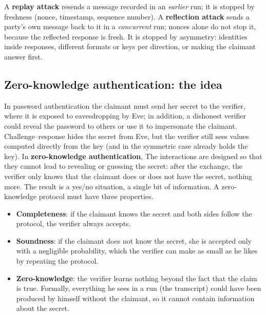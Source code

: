 \begin{trap}
A \textbf{replay attack} resends a message recorded in an \emph{earlier} run; it is stopped by freshness (nonce, timestamp, sequence number). A \textbf{reflection attack} sends a party's own message back to it in a \emph{concurrent} run; nonces alone do not stop it, because the reflected response is fresh. It is stopped by asymmetry: identities inside responses, different formats or keys per direction, or making the claimant answer first.
\end{trap}

\subsection{Zero-knowledge authentication: the idea \new}

In password authentication the claimant must send her secret to the verifier, where it is exposed to eavesdropping by Eve; in addition, a dishonest verifier could reveal the password to others or use it to impersonate the claimant. Challenge--response hides the secret from Eve, but the verifier still sees values computed directly from the key (and in the symmetric case already holds the key). In \textbf{zero-knowledge authentication},  The interactions are designed so that they cannot lead to revealing or guessing the secret: after the exchange, the verifier only knows that the claimant does or does not have the secret, nothing more. The result is a yes/no situation, a single bit of information. A zero-knowledge protocol must have three properties.
\begin{itemize}
  \item \textbf{Completeness}: if the claimant knows the secret and both sides follow the protocol, the verifier always accepts.
  \item \textbf{Soundness}: if the claimant does not know the secret, she is accepted only with a negligible probability, which the verifier can make as small as he likes by repeating the protocol.
  \item \textbf{Zero-knowledge}: the verifier learns nothing beyond the fact that the claim is true. Formally, everything he sees in a run (the transcript) could have been produced by himself without the claimant, so it cannot contain information about the secret.
\end{itemize}

